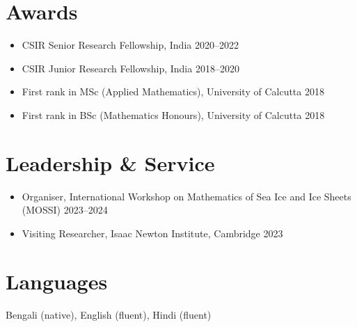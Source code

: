 \documentclass[10pt,a4paper]{article}
\begin{document}
\section*{Awards}
\begin{itemize}
  \item CSIR Senior Research Fellowship, India \hfill 2020--2022
  \item CSIR Junior Research Fellowship, India \hfill 2018--2020
  \item First rank in MSc (Applied Mathematics), University of Calcutta \hfill 2018
    \item First rank in BSc (Mathematics Honours), University of Calcutta \hfill 2018
\end{itemize}

\section*{Leadership \& Service}
\begin{itemize}
  \item Organiser, International Workshop on Mathematics of Sea Ice and Ice Sheets (MOSSI) \hfill 2023--2024
  \item Visiting Researcher, Isaac Newton Institute, Cambridge \hfill 2023
\end{itemize}

\section*{Languages}
Bengali (native), English (fluent), Hindi (fluent)

\end{document}
